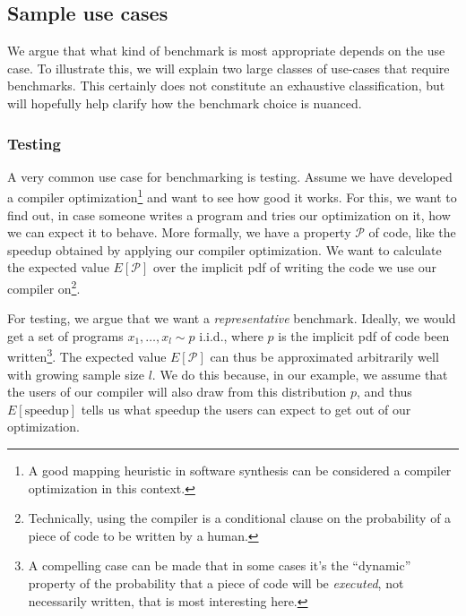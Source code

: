\subsection{Sample use cases}

We argue that what kind of benchmark is most appropriate depends on the use case. To illustrate this, we will explain two large classes of use-cases that require benchmarks. This certainly does not constitute an exhaustive classification, but will hopefully help clarify how the benchmark choice is nuanced.

\subsubsection{Testing}
\label{sec:testing}

A very common use case for benchmarking is testing. Assume we have developed a compiler optimization\footnote{A good mapping heuristic in software synthesis can be considered a compiler optimization in this context.} and want to see how good it works.
For this, we want to find out, in case someone writes a program and tries our optimization on it, how we can expect it to behave.
More formally, we have a property $\mathcal{P}$ of code, like the speedup obtained by applying our compiler optimization.
We want to calculate the expected value $E[\mathcal{P}]$ over the implicit \ac{pdf} of writing the code we use our compiler on\footnote{Technically, using the compiler is a conditional clause on the probability of a piece of code to be written by a human.}.

For testing, we argue that we want a \emph{representative} benchmark. Ideally, we would get a set of programs $x_1, \ldots, x_l \sim p$ \acs{i.i.d.}, where $p$ is the implicit \ac{pdf} of code been written\footnote{A compelling case can be made that in some cases it's the ``dynamic'' property of the probability that a piece of code will be \emph{executed}, not necessarily written, that is most interesting here.}.
The expected value $E[\mathcal{P}]$ can thus be approximated arbitrarily well with growing sample size $l$.
We do this because, in our example, we assume that the users of our compiler will also draw from this distribution $p$, and thus $E[\text{speedup}]$ tells us what speedup the users can expect to get out of our optimization.

